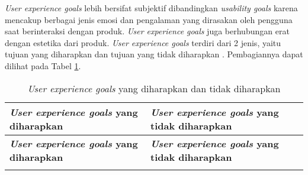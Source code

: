 \textit{User experience goals} lebih bersifat subjektif dibandingkan \textit{usability goals} karena mencakup berbagai jenis emosi dan pengalaman yang dirasakan oleh pengguna saat berinteraksi dengan produk. \textit{User experience goals} juga berhubungan erat dengan estetika dari produk. \textit{User experience goals} terdiri dari 2 jenis, yaitu tujuan yang diharapkan dan tujuan yang tidak diharapkan \parencite{PreeceRogersSharp15}. Pembagiannya dapat dilihat pada Tabel \ref{tab:ux_goals}.

\RaggedLeft
\begin{footnotesize}
\begin{longtable}[c]{|>{\cbnormspacing}m{}|>{\cbnormspacing}m{}|}
  \caption{\textit{User experience goals} yang diharapkan dan tidak diharapkan}
  \label{tab:ux_goals} \\
  \hline \rowcolor[HTML]{A3E5F5}
  \centering\textbf{\textit{User experience goals} yang diharapkan} & \textbf{\textit{User experience goals} yang tidak diharapkan} \\ \hline \endfirsthead
  \hline \rowcolor[HTML]{A3E5F5}
  \centering\textbf{\textit{User experience goals} yang diharapkan} & \textbf{\textit{User experience goals} yang tidak diharapkan} \\ \hline \endhead
  
  \hline \endfoot
  

\end{longtable}
\end{footnotesize}
